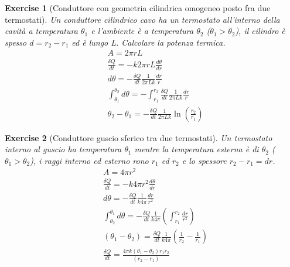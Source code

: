 \documentclass[10pt,a4paper]{article}
\newtheorem{exercise}{Exercise}
\begin{document}
\begin{exercise}[Conduttore con geometria cilindrica omogeneo posto fra due termostati]
	Un conduttore cilindrico cavo ha un termostato all'interno della cavità a temperatura $\theta_1$ e l'ambiente è a temperatura $\theta_2$ ($\theta_1 > \theta_2$), il cilindro è spesso \(d = r_2-r_1\) ed è lungo L. Calcolare la potenza termica. 
	\begin{align*}
		&A = 2\pi r L\\
		&\frac{\delta Q}{dt} = -k 2 \pi r L \frac{d\theta}{d r}\\
		&d\theta = -\frac{\delta Q}{d t}\frac{1}{2\pi L k}\frac{dr}{r}\\
		&\int_{\theta_1}^{\theta_2} d\theta = - \int_{r_1}^{r_2}  \frac{\delta Q}{d t}\frac{1}{2\pi L k}\frac{dr}{r}\\
		&\theta_2 - \theta_1 = -\frac{\delta Q}{d t}\frac{1}{2\pi L k}\ln\left(\frac{r_2}{r_1}\right)
	\end{align*}
\end{exercise}
\begin{exercise}[Conduttore guscio sferico tra due termostati]
	Un termostato interno al guscio ha temperatura $\theta_1$ mentre la temperatura esterna è di $\theta_2$ (\(\theta_1 > \theta_2\)), i raggi interno ed esterno rono $r_1$ ed $r_2$ e lo spessore \(r_2-r_1 = dr\).
	\begin{align*}
		&A = 4 \pi r^2\\
		&\frac{\delta Q }{dt} = -k 4\pi r^2 \frac{d\theta}{dr}\\
		&d \theta = -\frac{\delta Q }{dt} \frac{1}{k 4 \pi}\frac{dr}{r^2}\\
		&\int_{\theta_2}^{\theta_1}d\theta = -\frac{\delta Q }{dt} \frac{1}{k 4 \pi} \left(\int_{r_1}^{r_2}\frac{dr}{r^2}\right)\\
		&(\theta_1 - \theta_2) = \frac{\delta Q }{dt} \frac{1}{k 4 \pi}\left(\frac{1}{r_2}-\frac{1}{r_1}\right)\\
		&\frac{\delta Q }{dt} = \frac{4\pi k (\theta_1-\theta_2)r_1 r_2}{(r_2 - r_1)}
	\end{align*}
\end{exercise}
\end{document}
